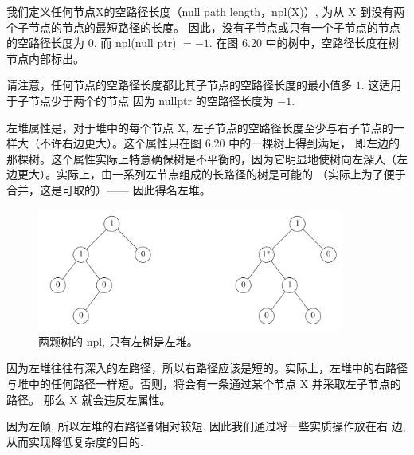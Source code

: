 \documentclass[a4paper]{ctexart}
\theoremstyle{definition}
\theoremstyle{definition}
\begin{document}
我们定义任何节点X的空路径长度（null path length，npl(X)）, 为从 X 到没有两个子节点的节点的最短路径的长度。
因此，没有子节点或只有一个子节点的节点的空路径长度为 0, 而 npl(null ptr) $= -1$. 在图 6.20 中的树中，空路径长度在树节点内部标出。

请注意，任何节点的空路径长度都比其子节点的空路径长度的最小值多 $1$. 这适用于子节点少于两个的节点 因为 nullptr 的空路径长度为 $-1$.

左堆属性是，对于堆中的每个节点 X, 左子节点的空路径长度至少与右子节点的一样大（不许右边更大）。这个属性只在图 6.20 中的一棵树上得到满足，
即左边的那棵树。这个属性实际上特意确保树是不平衡的，因为它明显地使树向左深入（左边更大）。实际上，由一系列左节点组成的长路径的树是可能的
（实际上为了便于合并，这是可取的）—— 因此得名左堆。

\begin{figure}
  \centering
  \includegraphics[width=0.9\textwidth]{images/npl.png}
  \caption{两颗树的 npl, 只有左树是左堆。}
  \label{fig::leftist_heap}
\end{figure}

因为左堆往往有深入的左路径，所以右路径应该是短的。实际上，左堆中的右路径与堆中的任何路径一样短。否则，将会有一条通过某个节点 X 并采取左子节点的路径。
那么 X 就会违反左属性。




因为左倾, 所以左堆的右路径都相对较短. 因此我们通过将一些实质操作放在右
边, 从而实现降低复杂度的目的.
\end{document}
